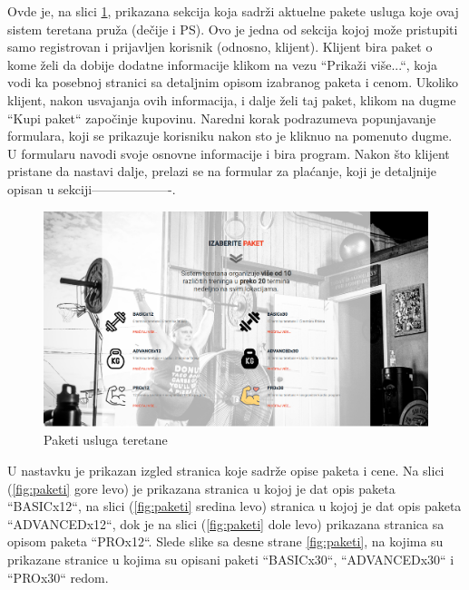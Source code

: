 \documentclass[../main.tex]{subfiles}
\begin{document}
Ovde je, na slici \ref{fig:paketi_teretane}, prikazana sekcija koja sadrži aktuelne pakete usluga koje ovaj sistem teretana pruža (dečije i PS). Ovo je jedna od sekcija kojoj može pristupiti samo registrovan i prijavljen korisnik (odnosno, klijent). Klijent bira paket o kome želi da dobije dodatne informacije klikom na vezu ``Prikaži više...``, koja vodi ka posebnoj stranici sa detaljnim opisom izabranog paketa i cenom. Ukoliko klijent, nakon usvajanja ovih informacija, i dalje želi taj paket, klikom na dugme ``Kupi paket`` započinje kupovinu. Naredni korak podrazumeva popunjavanje formulara, koji se prikazuje korisniku nakon sto je kliknuo na pomenuto dugme. U formularu navodi svoje osnovne informacije i bira program. Nakon što klijent pristane da nastavi dalje, prelazi se na formular za plaćanje, koji je detaljnije opisan u sekciji-------------------.

\begin{figure}[!ht]
\begin{center}
\includegraphics[scale=0.21]{sections/korisnicki_interfejs/screenshots/paketi_teretane.png}
\end{center}
\caption{Paketi usluga teretane}
\label{fig:paketi_teretane}
\end{figure}

U nastavku je prikazan izgled stranica koje sadrže opise paketa i cene. Na slici (\ref{fig:paketi} gore levo) je prikazana stranica u kojoj je dat opis paketa ``BASICx12``, na slici (\ref{fig:paketi} sredina levo) stranica u kojoj je dat opis paketa ``ADVANCEDx12``, dok je na slici (\ref{fig:paketi} dole levo) prikazana stranica sa opisom paketa ``PROx12``. Slede slike sa desne strane  \ref{fig:paketi}, na kojima su prikazane stranice u kojima su opisani paketi ``BASICx30``, ``ADVANCEDx30`` i ``PROx30`` redom.
\end{document}
